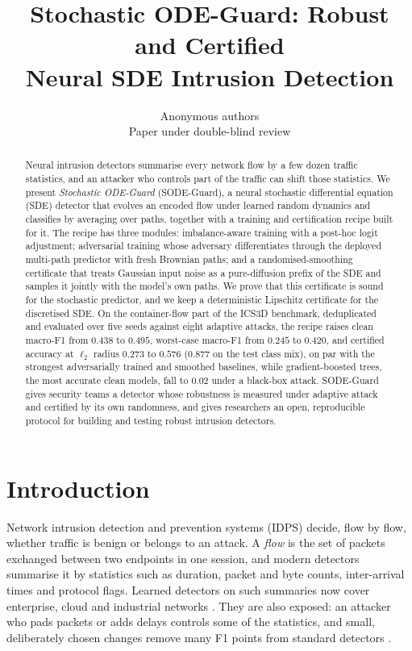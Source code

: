 \documentclass{article}
\title{Stochastic ODE-Guard: Robust and Certified\\Neural SDE Intrusion Detection}
\author{Anonymous authors\\Paper under double-blind review}
\theoremstyle{definition}
\begin{document}
\maketitle

\begin{abstract}
Neural intrusion detectors summarise every network flow by a few dozen traffic
statistics, and an attacker who controls part of the traffic can shift those
statistics. We present \emph{Stochastic ODE-Guard} (SODE-Guard), a neural
stochastic differential equation (SDE) detector that evolves an encoded flow
under learned random dynamics and classifies by averaging over paths, together
with a training and certification recipe built for it. The recipe has three
modules: imbalance-aware training with a post-hoc logit adjustment; adversarial
training whose adversary differentiates through the deployed multi-path
predictor with fresh Brownian paths; and a randomised-smoothing certificate
that treats Gaussian input noise as a pure-diffusion prefix of the SDE and
samples it jointly with the model's own paths. We prove that this certificate
is sound for the stochastic predictor, and we keep a deterministic Lipschitz
certificate for the discretised SDE. On the container-flow part of the ICS3D
benchmark, deduplicated and evaluated over five seeds against eight adaptive
attacks, the recipe raises clean macro-F1 from $0.438$ to $0.495$, worst-case
macro-F1 from $0.245$ to $0.420$, and certified accuracy at $\ell_2$ radius
$0.273$ to $0.576$ ($0.877$ on the test class mix), on par with the strongest
adversarially trained and smoothed baselines, while gradient-boosted trees, the
most accurate clean models, fall to $0.02$ under a black-box attack.
SODE-Guard gives security teams a detector whose robustness is measured under
adaptive attack and certified by its own randomness, and gives researchers an
open, reproducible protocol for building and testing robust intrusion detectors.
\end{abstract}

\section{Introduction}\label{sec:intro}
Network intrusion detection and prevention systems (IDPS) decide, flow by flow,
whether traffic is benign or belongs to an attack. A \emph{flow} is the set of
packets exchanged between two endpoints in one session, and modern detectors
summarise it by statistics such as duration, packet and byte counts,
inter-arrival times and protocol flags. Learned detectors on such summaries now
cover enterprise, cloud and industrial networks
\citep{lo2022egraphsage,wu2022rtids,anaedevha2026mstgnn}.
They are also exposed: an attacker who pads packets or adds delays controls
some of the statistics, and small, deliberately chosen changes remove many F1
points from standard detectors \citep{ennaji2024advsurvey,vitorino2024advbench,anaedevha2024robust}.
\end{document}
